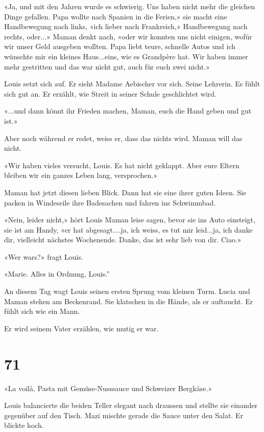 «Ja, und mit den Jahren wurde es schwierig. Uns haben nicht mehr die
gleichen Dinge gefallen. Papa wollte nach Spanien in die Ferien,» sie
macht eine Handbewegung nach links, «ich lieber nach Frankreich,»
Handbewegung nach rechts, oder...» Maman denkt nach, «oder wir konnten
uns nicht einigen, wofür wir unser Geld ausgeben wollten. Papa liebt
teure, schnelle Autos und ich wünschte mir ein kleines Haus...eins, wie
es Grandpère hat. Wir haben immer mehr gestritten und das war nicht gut,
auch für euch zwei nicht.»

Louis setzt sich auf. Er sieht Madame Aebischer vor sich. Seine
Lehrerin. Es fühlt sich gut an. Er erzählt, wie Streit in seiner Schule
geschlichtet wird.

«...und dann könnt ihr Frieden machen, Maman, euch die Hand geben und
gut ist.»

Aber noch während er redet, weiss er, dass das nichts wird. Maman will
das nicht.

«Wir haben vieles versucht, Louis. Es hat nicht geklappt. Aber eure
Eltern bleiben wir ein ganzes Leben lang, versprochen.»

Maman hat jetzt diesen lieben Blick. Dann hat sie eine ihrer guten
Ideen. Sie packen in Windeseile ihre Badesachen und fahren ins
Schwimmbad.

«Nein, leider nicht,» hört Louis Maman leise sagen, bevor sie ins Auto
einsteigt, sie ist am Handy, «er hat abgesagt....ja, ich weiss, es tut
mir leid...ja, ich danke dir, vielleicht nächstes Wochenende. Danke, das
ist sehr lieb von dir. Ciao.»

«Wer wars?» fragt Louis.

«Marie. Alles in Ordnung, Louis.''

An diesem Tag wagt Louis seinen ersten Sprung vom kleinen Turm. Lucia
und Maman stehen am Beckenrand. Sie klatschen in die Hände, als er
auftaucht. Er fühlt sich wie ein Mann.

Er wird seinem Vater erzählen, wie mutig er war.

\chapter{71}\label{section-71}

«La voilà, Pasta mit Gemüse-Nusssauce und Schweizer Bergkäse.»

Louis balancierte die beiden Teller elegant nach draussen und stellte
sie einander gegenüber auf den Tisch. Mazi mischte gerade die Sauce
unter den Salat. Er blickte hoch.

